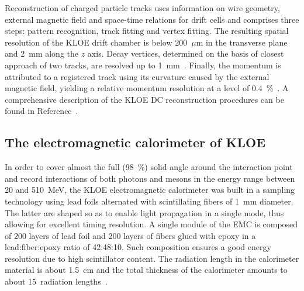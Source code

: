 Reconstruction of charged particle tracks uses information on wire geometry, external magnetic field and space-time relations for drift cells and comprises three steps: pattern recognition, track fitting and vertex fitting. The resulting spatial resolution of the KLOE drift chamber is below 200~$\mu$m in the transverse plane and 2~mm along the $z$ axis. Decay vertices, determined on the basis of closest approach of two tracks, are resolved up to 1~mm~\cite{Adinolfi:2002uk}. Finally, the momentum is attributed to a registered track using its curvature caused by the external magnetic field, yielding a relative momentum resolution at a level of \SI{0.4}{\percent}~\cite{kloe_results}. A comprehensive description of the KLOE DC reconstruction procedures can be found in Reference~\cite{data_handling}.

\subsection{The electromagnetic calorimeter of KLOE}
\label{sec:emc}
In order to cover almost the full (\SI{98}{\percent}) solid angle around the interaction point and record interactions of both photons and mesons in the energy range between 20 and 510~MeV, the KLOE electromagnetic calorimeter was built in a sampling technology using lead foils alternated with scintillating fibers of 1~mm diameter. The latter are shaped so as to enable light propagation in a single mode, thus allowing for excellent timing resolution. A single module of the EMC is composed of 200 layers of lead foil and 200 layers of fibers glued with epoxy in a lead:fiber:epoxy ratio of 42:48:10. Such composition ensures a good energy resolution due to high scintillator content. The radiation length in the calorimeter material is about 1.5~cm and the total thickness of the calorimeter amounts to about 15~radiation lengths~\cite{Adinolfi:2002zx}.

